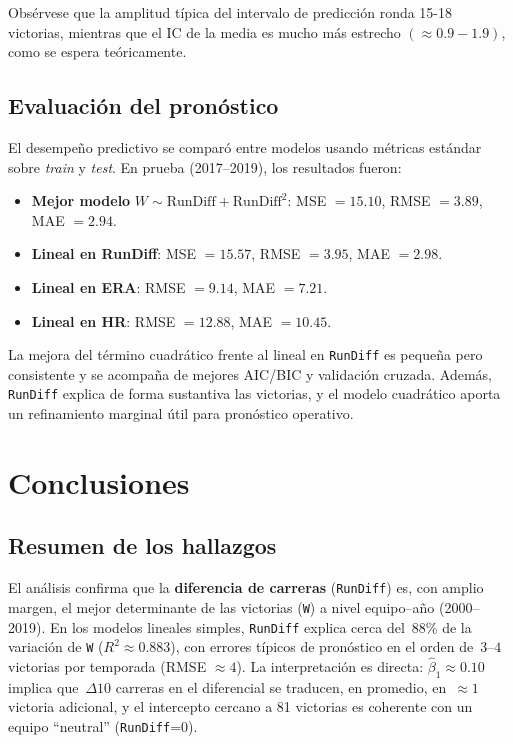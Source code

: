 \documentclass[man,floatsintext]{apa7}
\begin{document}
Obsérvese que la amplitud típica del intervalo de predicción ronda 15-18 victorias, mientras que el IC de la media es mucho más estrecho $(\approx0.9-1.9)$, como se espera teóricamente.

\subsection{Evaluación del pronóstico}
El desempeño predictivo se comparó entre modelos usando métricas estándar sobre \emph{train} y \emph{test}.
En prueba (2017–2019), los resultados fueron:
\begin{itemize}
    \item \textbf{Mejor modelo} \(W \sim \text{RunDiff} + \text{RunDiff}^2\): MSE \(=15.10\), RMSE \(=3.89\), MAE \(=2.94\).
    \item \textbf{Lineal en RunDiff}: MSE \(=15.57\), RMSE \(=3.95\), MAE \(=2.98\).
    \item \textbf{Lineal en ERA}: RMSE \(=9.14\), MAE \(=7.21\).
    \item \textbf{Lineal en HR}: RMSE \(=12.88\), MAE \(=10.45\).
\end{itemize}
La mejora del término cuadrático frente al lineal en \texttt{RunDiff} es pequeña pero consistente
y se acompaña de mejores AIC/BIC y validación cruzada. Además, \texttt{RunDiff} explica de forma sustantiva las victorias, y el modelo cuadrático aporta un 
refinamiento marginal útil para pronóstico operativo.
\section{Conclusiones}
\subsection{Resumen de los hallazgos}
El análisis confirma que la \textbf{diferencia de carreras} (\texttt{RunDiff}) es, con amplio margen, el mejor determinante de las victorias (\texttt{W}) a nivel equipo–año (2000–2019). En los modelos lineales simples, \texttt{RunDiff} explica cerca del \(\,88\%\) de la variación de \texttt{W} (\(R^2\approx0.883\)), con errores típicos de pronóstico en el orden de \(\,3\text{--}4\) victorias por temporada (RMSE \(\approx 4\)). La interpretación es directa: \(\hat\beta_1\approx 0.10\) implica que \(\,\Delta 10\) carreras en el diferencial se traducen, en promedio, en \(\,\approx 1\) victoria adicional, y el intercepto cercano a 81 victorias es coherente con un equipo ``neutral'' (\texttt{RunDiff}=0).
\end{document}
